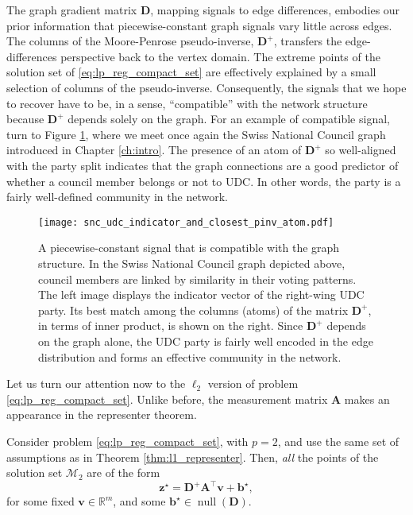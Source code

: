 The graph gradient matrix $\mathbf{D}$, mapping signals to edge differences, embodies our prior information that piecewise-constant graph signals vary little across edges. The columns of the  Moore-Penrose pseudo-inverse, $\mathbf{D}^+$, transfers the edge-differences perspective back to the vertex domain. The extreme points of the solution set of \eqref{eq:lp_reg_compact_set} are effectively explained by a small selection of columns of the pseudo-inverse. Consequently, the signals that we hope to recover have to be, in a sense, ``compatible'' with the network structure because $\mathbf{D}^+$ depends solely on the graph. For an example of compatible signal, turn to Figure \ref{fig:snc_udc_indicator_and_closest_pinv_atom}, where we meet once again the Swiss National Council graph introduced in Chapter \ref{ch:intro}. The presence of an atom of $\mathbf{D}^+$ so well-aligned with the party split indicates that the graph connections are a good predictor of whether a council member belongs or not to UDC. In other words, the party is a fairly well-defined community in the network.

\clearpage

\begin{figure}[H]
    \centering
    \texttt{[image: snc\_udc\_indicator\_and\_closest\_pinv\_atom.pdf]}
    \caption[A piecewise-constant signal that is compatible with the graph structure]{A piecewise-constant signal that is compatible with the graph structure. In the Swiss National Council graph depicted above, council members are linked by similarity in their voting patterns. The left image displays the indicator vector of the right-wing UDC party. Its best match among the columns (atoms) of the matrix $\mathbf{D}^+$, in terms of inner product, is shown on the right. Since $\mathbf{D}^+$ depends on the graph alone, the UDC party is fairly well encoded in the edge distribution and forms an effective community in the network.}
    \label{fig:snc_udc_indicator_and_closest_pinv_atom}
\end{figure}

Let us turn our attention now to the $\ell_2$ version of problem \eqref{eq:lp_reg_compact_set}. Unlike before, the measurement matrix $\mathbf{A}$ makes an appearance in the representer theorem.

\begin{theorem}\label{thm:l2_representer}
    Consider problem \eqref{eq:lp_reg_compact_set}, with $p=2$, and use the same set of assumptions as in Theorem \ref{thm:l1_representer}. Then, \emph{all} the points of the solution set $\mathcal{M}_2$ are of the form
    \begin{equation}
        \mathbf{z}^\star = \mathbf{D}^+ \mathbf{A}^\top \mathbf{v} + \mathbf{b}^\star,
    \end{equation}
    for some fixed $\mathbf{v} \in \mathbb{R}^{m}$, and some $\mathbf{b}^\star \in \operatorname{null} \left ( \mathbf{D} \right )$.
\end{theorem}

